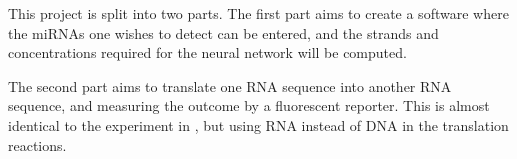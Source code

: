 This project is split into two parts. The first part aims to create a software where the miRNAs one wishes to detect can be entered, and the strands and concentrations required for the neural network will be computed.

The second part aims to translate one RNA sequence into another RNA sequence, and measuring the outcome by a fluorescent reporter. This is almost identical to the experiment in \cite{Picuri2009}, but using RNA instead of DNA in the translation reactions.
